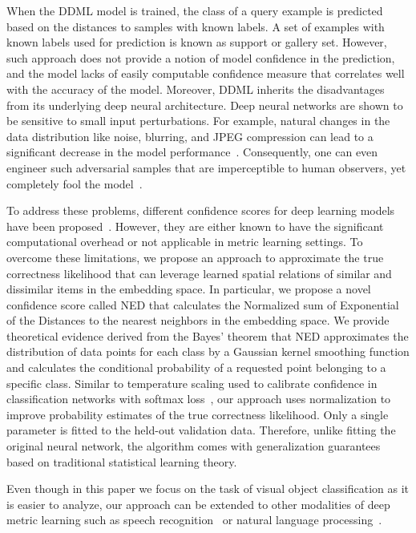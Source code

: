 \documentclass{article}
\begin{document}
When the DDML model is trained, the class of a query example is predicted based on the distances to samples with known labels.  A set of examples with known labels used for prediction is known as support or gallery set. However, such approach does not provide a notion of model confidence in the prediction, and the model lacks of easily computable confidence measure that correlates well with the accuracy of the model. Moreover, DDML inherits the disadvantages from its underlying deep neural architecture. Deep neural networks are shown to be sensitive to small input perturbations. For example, natural changes in the data distribution like noise, blurring, and JPEG compression can lead to a significant decrease in the model performance~\cite{b34, b37, b51}. Consequently, one can even engineer such adversarial samples that are imperceptible to human observers, yet completely fool the model~\cite{b23, b25, b26, b27, b28}.

To address these problems, different confidence scores for deep learning models have been proposed~\cite{b27, b41, towards_nn_knows_when_fails, pac, distance-based-confidence, attributes-based-confidence}. However, they are either known to have the significant computational overhead or not applicable in metric learning settings. To overcome these limitations, we propose an approach to approximate the true correctness likelihood that can leverage learned spatial relations of similar and dissimilar items in the embedding space. In particular, we propose a novel confidence score called NED that calculates the Normalized sum of Exponential of the Distances to the nearest neighbors in the embedding space. We provide theoretical evidence derived from the Bayes' theorem that NED approximates the distribution of data points for each class by a Gaussian kernel smoothing function and calculates the conditional probability of a requested point belonging to a specific class. Similar to temperature scaling used to calibrate confidence in classification networks with softmax loss~\cite{b68}, our approach uses normalization to improve probability estimates of the true correctness likelihood. Only a single parameter is fitted to the held-out validation data. Therefore, unlike fitting the original neural network, the algorithm comes with generalization guarantees based on traditional statistical learning theory.

Even though in this paper we focus on the task of visual object classification as it is easier to analyze, our approach can be extended to other modalities of deep metric learning such as speech recognition~\cite{b58} or natural language processing~\cite{b59}.
\end{document}
